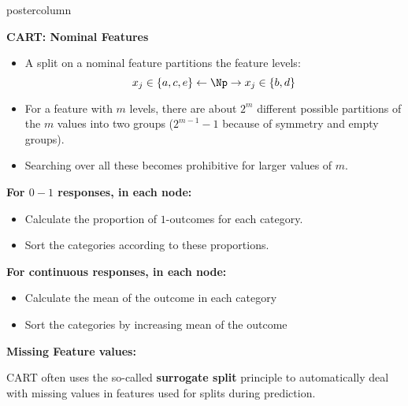 \documentclass{beamer}
\begin{document}
\begin{frame}[fragile]{}
\begin{columns}
\begin{column}{.31\textwidth}
\begin{beamercolorbox}[center]{postercolumn}
\begin{minipage}{.98\textwidth}
\parbox[t][\columnheight]{\textwidth}{
  \begin{myblock}{ }
  
  \begin{codebox}
  \textbf{CART: Nominal Features}	
  \end{codebox}
  
  \begin{itemize}[$\bullet$]     
  \setlength{\itemindent}{+.3in}
  \item A split on a nominal feature partitions the feature levels:
    $$x_j \in \{a,c,e\} \leftarrow \Np \rightarrow x_j \in \{b,d\} $$
    \item For a feature with $m$ levels,
  there are about $2^m$ different possible partitions of the $m$ values into two groups\vspace*{1ex} ($2^{m-1} - 1$ because of symmetry and empty groups).
  \item Searching over all these becomes prohibitive for larger values of $m$.
  \end{itemize}

  \begin{codebox}
  \textbf{For $0-1$ responses, in each node: }
  \end{codebox}
  
  \begin{itemize}[$\bullet$]     
  \setlength{\itemindent}{+.3in}
  \item Calculate the proportion of $1$-outcomes for each category.
  \item Sort the categories according to these proportions.
  \end{itemize}

  \begin{codebox}
  \textbf{For continuous responses, in each node: }
  \end{codebox}
  
  \begin{itemize}[$\bullet$]     
  \setlength{\itemindent}{+.3in}
  \item Calculate the mean of the outcome in each category
  \item Sort the categories by increasing mean of the outcome
  \end{itemize}

  \begin{codebox}	
  \textbf{Missing Feature values: }	\end{codebox}
  CART often uses the so-called \textbf{surrogate split} principle to automatically deal with missing values in features used for splits during prediction.
  \vspace*{1ex}
  \end{myblock}
  
}
\end{minipage}
\end{beamercolorbox}
\end{column}
\end{columns}
\end{frame}
\end{document}
